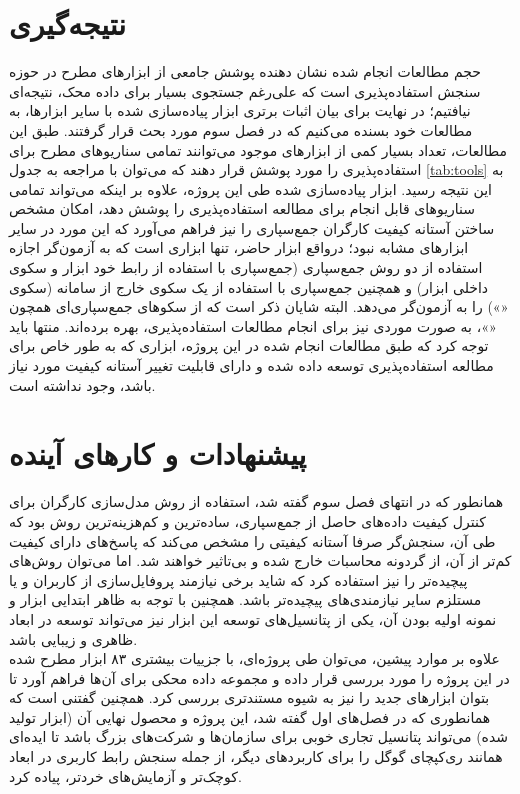\section{نتیجه‌گیری}
حجم مطالعات انجام شده نشان دهنده پوشش جامعی از ابزارهای مطرح در حوزه سنجش استفاده‌پذیری است که علی‌رغم جستجوی بسیار برای داده‌ محک، نتیجه‌ای نیافتیم؛ در نهایت برای بیان اثبات برتری ابزار پیاده‌سازی شده با سایر ابزارها، به مطالعات خود بسنده می‌کنیم که در فصل سوم مورد بحث قرار گرفتند. طبق این مطالعات، تعداد بسیار کمی از ابزارهای موجود می‌توانند تمامی سناریو‌های مطرح برای استفاده‌پذیری را مورد پوشش قرار دهند که می‌توان با مراجعه به جدول
\ref{tab:tools}
به این نتیجه رسید. ابزار پیاده‌سازی شده طی این پروژه، علاوه بر اینکه می‌تواند تمامی سناریوهای قابل انجام برای مطالعه استفاده‌پذیری را پوشش دهد، امکان مشخص ساختن آستانه کیفیت
کارگران جمع‌سپاری را نیز فراهم می‌آورد که این مورد در سایر ابزارهای مشابه نبود؛ درواقع ابزار حاضر، تنها ابزاری است که به آزمون‌گر اجازه استفاده از دو روش جمع‌سپاری (جمع‌سپاری با استفاده از رابط خود ابزار و سکوی داخلی ابزار) و همچنین جمع‌سپاری با استفاده از یک سکوی خارج از سامانه (سکوی
«»)
را به آزمون‌گر می‌دهد. البته شایان ذکر است که از سکوهای جمع‌سپاری‌ای همچون
«»،
به صورت موردی
نیز برای انجام مطالعات استفاده‌پذیری، بهره برده‌اند. منتها باید توجه کرد که طبق مطالعات انجام شده در این پروژه، ابزاری که به طور خاص برای مطالعه استفاده‌پذیری توسعه داده شده و دارای قابلیت تغییر آستانه کیفیت مورد نیاز باشد، وجود نداشته است.
\section{پیشنهادات و کارهای آینده}
همانطور که در انتهای فصل سوم گفته شد، استفاده از روش مدل‌سازی کارگران برای کنترل کیفیت داده‌های حاصل از جمع‌سپاری، ساده‌ترین و کم‌هزینه‌ترین روش بود که طی آن، سنجش‌گر صرفا آستانه کیفیتی را مشخص می‌کند که پاسخ‌های دارای کیفیت کم‌تر از آن، از گردونه محاسبات خارج شده و بی‌تاثیر خواهند شد. اما می‌توان روش‌های پیچیده‌تر را نیز استفاده کرد که شاید برخی نیازمند پروفایل‌سازی از کاربران و یا مستلزم سایر نیازمندی‌های پیچیده‌تر باشد. همچنین با توجه به ظاهر ابتدایی ابزار و نمونه اولیه بودن آن، یکی از پتانسیل‌های توسعه این ابزار نیز می‌تواند توسعه در ابعاد ظاهری و زیبایی باشد.\\
علاوه بر موارد پیشین، می‌توان طی پروژه‌ای، با جزییات بیشتری ۸۳ ابزار مطرح شده در این پروژه را مورد بررسی قرار داده و مجموعه داده محکی برای آن‌ها فراهم آورد تا بتوان ابزارهای جدید را نیز به شیوه مستندتری بررسی کرد. همچنین گفتنی است که همانطوری که در فصل‌های اول گفته شد، این پروژه و محصول نهایی آن (ابزار تولید شده) می‌تواند پتانسیل تجاری خوبی برای سازمان‌ها و شرکت‌های بزرگ باشد تا ایده‌ای همانند ری‌کپچای گوگل را برای کاربردهای دیگر، از جمله سنجش رابط کاربری در ابعاد کوچک‌تر و آزمایش‌های خردتر، پیاده کرد.